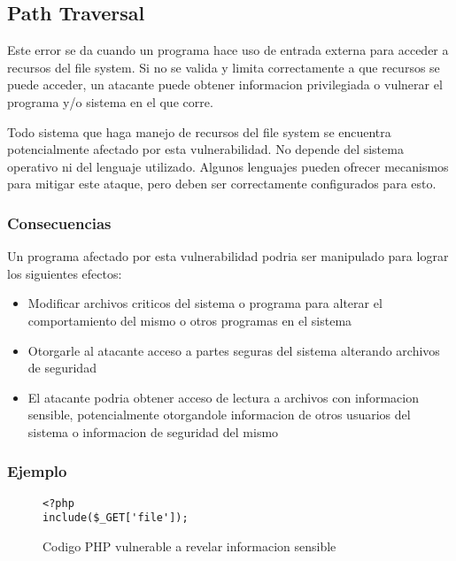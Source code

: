 \subsection{Path Traversal}

Este error se da cuando un programa hace uso de entrada externa para acceder a recursos del file system.
Si no se valida y limita correctamente a que recursos se puede acceder, un atacante puede obtener informacion privilegiada o vulnerar el programa y/o sistema en el que corre.

Todo sistema que haga manejo de recursos del file system se encuentra potencialmente afectado por esta vulnerabilidad.
No depende del sistema operativo ni del lenguaje utilizado.
Algunos lenguajes pueden ofrecer mecanismos para mitigar este ataque, pero deben ser correctamente configurados para esto.

\subsubsection{Consecuencias}

Un programa afectado por esta vulnerabilidad podria ser manipulado para lograr los siguientes efectos:

\begin{itemize}

    \item Modificar archivos criticos del sistema o programa para alterar el comportamiento del mismo o otros programas en el sistema

    \item Otorgarle al atacante acceso a partes seguras del sistema alterando archivos de seguridad

    \item El atacante podria obtener acceso de lectura a archivos con informacion sensible, potencialmente otorgandole informacion de otros usuarios del sistema o informacion de seguridad del mismo

\end{itemize}

\subsubsection{Ejemplo}

\begin{figure}[H]

    \begin{lstlisting}
<?php
include($_GET['file']);
    \end{lstlisting}

    \caption{Codigo PHP vulnerable a revelar informacion sensible}
    \label{code:php-traversal}

\end{figure}

